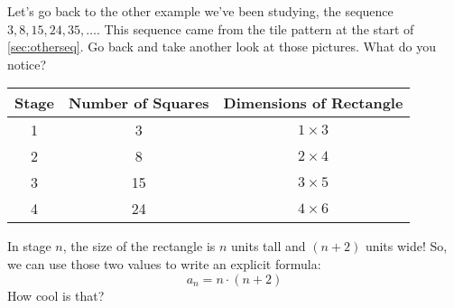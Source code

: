 Let's go back to the other example we've been studying, the sequence $3, 8, 15, 24, 35, \dotsc$. This sequence came from the tile pattern at the start of \cref{sec:otherseq}. Go back and take another look at those pictures. What do you notice?

\begin{table}
\begin{tabular}{c|c|c}
Stage		& Number of Squares		& Dimensions of Rectangle	\\\hline
1			& 3							& $1 \times 3$		\\
2			& 8							& $2 \times 4$		\\
3			& 15						& $3 \times 5$		\\
4			& 24						& $4 \times 6$		\\
\end{tabular}
\end{table}%

In stage $n$, the size of the rectangle is $n$ units tall and $(n+2)$ units wide! So, we can use those two values to write an explicit formula:
\[a_n = n \cdot (n+2)\]
How cool is that?

